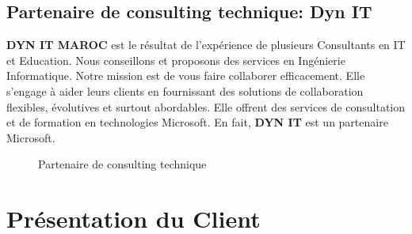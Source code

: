 \documentclass[a4paper]{report}
\begin{document}
\begin{doublespace}
	\subsection{Partenaire de consulting technique: Dyn IT}

	\textbf{DYN IT MAROC} est le résultat de l’expérience de plusieurs
	Consultants en IT et Education.
	Nous conseillons et proposons des services en Ingénierie Informatique.
	Notre mission est de
	vous faire collaborer efficacement. Elle s'engage à aider leurs clients
	en fournissant des solutions de collaboration flexibles, évolutives et
	surtout abordables.
	Elle offrent des services de consultation et de formation en technologies
	Microsoft. En fait, \textbf{DYN IT} est un partenaire Microsoft.
	\begin{figure}[H]
		\begin{center}
			\caption{Partenaire de consulting technique}
		\end{center}
	\end{figure}
	\section{Présentation du Client}


\end{doublespace}
\end{document}
